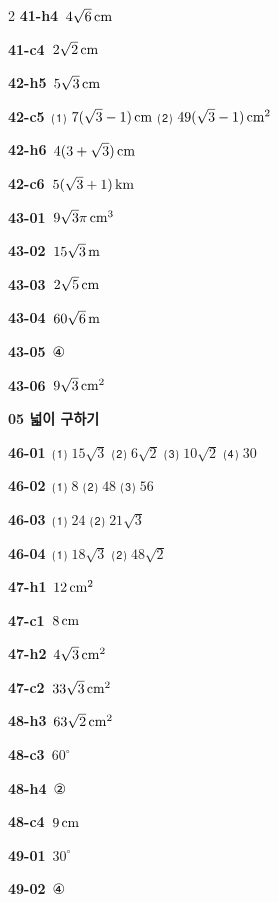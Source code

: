 \documentclass[10pt,a4paper]{article}
\begin{document}
\begin{multicols}{2}
\noindent\textbf{41-h4}\ $4\sqrt{6}\mkern3mu \mathrm{cm}$\par
\noindent\textbf{41-c4}\ $2\sqrt{2}\mkern3mu \mathrm{cm}$\par
\noindent\textbf{42-h5}\ $5\sqrt{3}\mkern3mu \mathrm{cm}$\par
\noindent\textbf{42-c5}\ ⑴ $7(\sqrt{3}-1)\mkern3mu \mathrm{cm}$ ⑵ $49(\sqrt{3}-1)\mkern3mu \mathrm{cm}^2$\par
\noindent\textbf{42-h6}\ $4(3+\sqrt{3})\mkern3mu \mathrm{cm}$\par
\noindent\textbf{42-c6}\ $5(\sqrt{3}+1)\mkern3mu \mathrm{km}$\par
\noindent\textbf{43-01}\ $9\sqrt{3}\pi\mkern3mu \mathrm{cm}^3$\par
\noindent\textbf{43-02}\ $15\sqrt{3}\mkern3mu \mathrm{m}$\par
\noindent\textbf{43-03}\ $2\sqrt{5}\mkern3mu \mathrm{cm}$\par
\noindent\textbf{43-04}\ $60\sqrt{6}\mkern3mu \mathrm{m}$\par
\noindent\textbf{43-05}\ ④\par
\noindent\textbf{43-06}\ $9\sqrt{3}\mkern3mu \mathrm{cm}^2$\par
\noindent\textbf{05 넓이 구하기}\par\smallskip
\noindent\textbf{46-01}\ ⑴ $15\sqrt{3}$ ⑵ $6\sqrt{2}$ ⑶ $10\sqrt{2}$ ⑷ $30$\par
\noindent\textbf{46-02}\ ⑴ $8$ ⑵ $48$ ⑶ $56$\par
\noindent\textbf{46-03}\ ⑴ $24$ ⑵ $21\sqrt{3}$\par
\noindent\textbf{46-04}\ ⑴ $18\sqrt{3}$ ⑵ $48\sqrt{2}$\par
\noindent\textbf{47-h1}\ $12\mkern3mu \mathrm{cm}^2$\par
\noindent\textbf{47-c1}\ $8\mkern3mu \mathrm{cm}$\par
\noindent\textbf{47-h2}\ $4\sqrt{3}\mkern3mu \mathrm{cm}^2$\par
\noindent\textbf{47-c2}\ $33\sqrt{3}\mkern3mu \mathrm{cm}^2$\par
\noindent\textbf{48-h3}\ $63\sqrt{2}\mkern3mu \mathrm{cm}^2$\par
\noindent\textbf{48-c3}\ $60^\circ$\par
\noindent\textbf{48-h4}\ ②\par
\noindent\textbf{48-c4}\ $9\mkern3mu \mathrm{cm}$\par
\noindent\textbf{49-01}\ $30^\circ$\par
\noindent\textbf{49-02}\ ④\par

\end{multicols}
\end{document}
